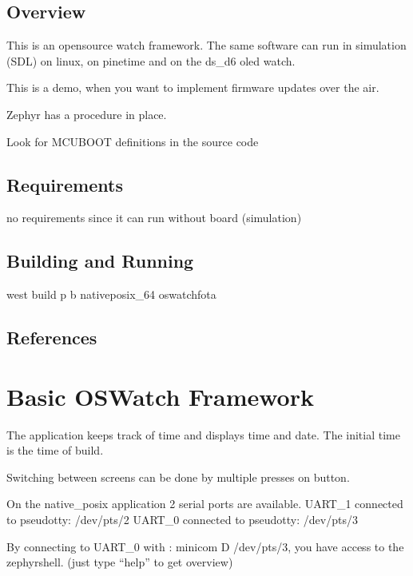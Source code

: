 \documentclass[letterpaper,10pt,english]{sphinxmanual}
\begin{document}
\subsection{Overview}
\label{\detokenize{samples/apposwatch-fotaREADME:overview}}
This is an opensource watch framework.
The same software can run in simulation (SDL) on linux, on pinetime and on the ds\_d6 oled watch.

This is a demo, when you want to implement firmware updates over the air.

Zephyr has a procedure in place.

Look for MCUBOOT definitions in the source code


\subsection{Requirements}
\label{\detokenize{samples/apposwatch-fotaREADME:requirements}}
no requirements since it can run without board (simulation)


\subsection{Building and Running}
\label{\detokenize{samples/apposwatch-fotaREADME:building-and-running}}
west build \sphinxhyphen{}p \sphinxhyphen{}b  native\sphinxhyphen{}posix\_64 oswatch\sphinxhyphen{}fota


\subsection{References}
\label{\detokenize{samples/apposwatch-fotaREADME:references}}

\section{Basic OSWatch Framework}
\label{\detokenize{samples/apposwatchREADME:basic-oswatch-framework}}\label{\detokenize{samples/apposwatchREADME:oswatch}}\label{\detokenize{samples/apposwatchREADME::doc}}
The application keeps track of time and displays time and date.
The initial time is the time of build.

Switching between screens can be done by multiple presses on button.

On the native\_posix application 2 serial ports are available.
UART\_1 connected to pseudotty: /dev/pts/2
UART\_0 connected to pseudotty: /dev/pts/3

By connecting to UART\_0 with :  minicom \sphinxhyphen{}D /dev/pts/3, you have access to the zephyr\sphinxhyphen{}shell.
(just type “help” to get overview)
\end{document}
